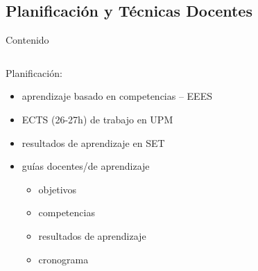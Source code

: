 \documentclass[xcolor=table,xcolor=x11names]{beamer}
\begin{document}
\subsection{Planificación y Técnicas Docentes}
\begin{frame}[allowframebreaks]{Contenido}
    \tableofcontents[currentsubsection]
\end{frame}

\begin{frame}{\subsecname}
    \begin{columns}[T] %
\begin{column}{.48\textwidth}

Planificación:
\begin{itemize}
    \item aprendizaje basado en competencias -- EEES
    \item ECTS (26-27h) de trabajo en UPM
    \item resultados de aprendizaje en SET
    \item guías docentes/de aprendizaje
        \begin{itemize}
            \item objetivos
            \item competencias
            \item resultados de aprendizaje 
            \item cronograma 
        \end{itemize}
\end{itemize}

\end{column}%
\hfill%
\begin{column}{.48\textwidth}


\end{column}
\end{columns}
\end{frame}
\end{document}
